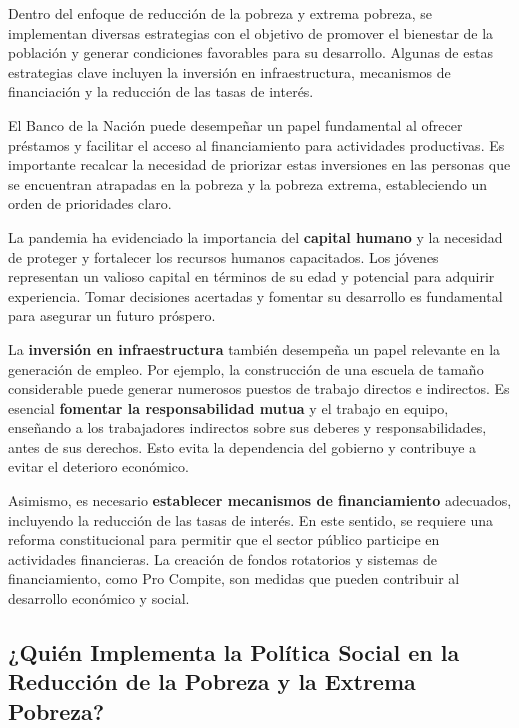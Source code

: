 \documentclass[
  letterpaper,
  DIV=11,
  numbers=noendperiod]{scrartcl}
\begin{document}
Dentro del enfoque de reducción de la pobreza y extrema pobreza, se
implementan diversas estrategias con el objetivo de promover el
bienestar de la población y generar condiciones favorables para su
desarrollo. Algunas de estas estrategias clave incluyen la inversión en
infraestructura, mecanismos de financiación y la reducción de las tasas
de interés.

El Banco de la Nación puede desempeñar un papel fundamental al ofrecer
préstamos y facilitar el acceso al financiamiento para actividades
productivas. Es importante recalcar la necesidad de priorizar estas
inversiones en las personas que se encuentran atrapadas en la pobreza y
la pobreza extrema, estableciendo un orden de prioridades claro.

La pandemia ha evidenciado la importancia del \textbf{capital humano} y
la necesidad de proteger y fortalecer los recursos humanos capacitados.
Los jóvenes representan un valioso capital en términos de su edad y
potencial para adquirir experiencia. Tomar decisiones acertadas y
fomentar su desarrollo es fundamental para asegurar un futuro próspero.

La \textbf{inversión en infraestructura} también desempeña un papel
relevante en la generación de empleo. Por ejemplo, la construcción de
una escuela de tamaño considerable puede generar numerosos puestos de
trabajo directos e indirectos. Es esencial \textbf{fomentar la
responsabilidad mutua} y el trabajo en equipo, enseñando a los
trabajadores indirectos sobre sus deberes y responsabilidades, antes de
sus derechos. Esto evita la dependencia del gobierno y contribuye a
evitar el deterioro económico.

Asimismo, es necesario \textbf{establecer mecanismos de financiamiento}
adecuados, incluyendo la reducción de las tasas de interés. En este
sentido, se requiere una reforma constitucional para permitir que el
sector público participe en actividades financieras. La creación de
fondos rotatorios y sistemas de financiamiento, como Pro Compite, son
medidas que pueden contribuir al desarrollo económico y social.

\hypertarget{quiuxe9n-implementa-la-poluxedtica-social-en-la-reducciuxf3n-de-la-pobreza-y-la-extrema-pobreza}{%
\subsection{¿Quién Implementa la Política Social en la Reducción de la
Pobreza y la Extrema
Pobreza?}\label{quiuxe9n-implementa-la-poluxedtica-social-en-la-reducciuxf3n-de-la-pobreza-y-la-extrema-pobreza}}
\end{document}
